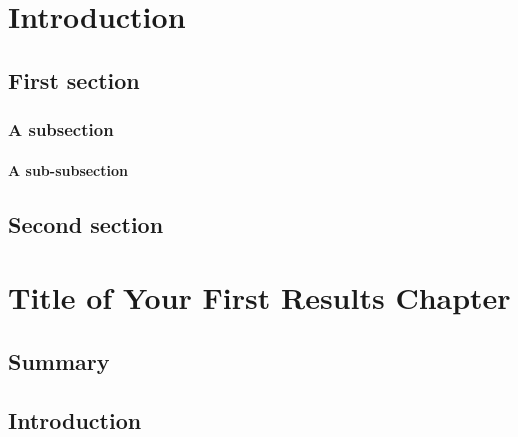 \setcounter{page}{1}

\chapter{Introduction}
\label{ch:introduction}
    \section{First section}
    
    \label{sec:ch1_intro}
        \subsection{A subsection}
        
        \label{sec:ch1_background}
            \subsubsection{A sub-subsection}
            
            \label{sec:ch1_details}
    \section{Second section}
    
    \label{sec:ch1_second_section}
\newpage

\chapter{Title of Your First Results Chapter}
\label{ch:ch2}
    \section{Summary}
    \label{sec:ch2_summary}
    

    \section{Introduction}
    \label{sec:ch2_intro}
    

